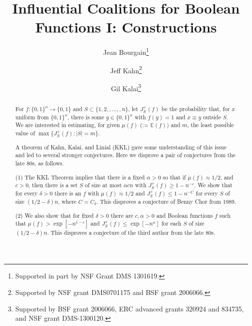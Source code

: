 \documentclass{toc}
\newcommand{\mn}[0]{\medskip\noindent}
\renewcommand{\dots}[0]{,\ldots,}
\newcommand{\0}[0]{\emptyset}
\newcommand{\ga}[0]{\alpha }
\newcommand{\gd}[0]{\delta }
\begin{document}
\renewcommand{\thefootnote}{\fnsymbol{footnote}} %
%
%

\begin{frontmatter} %
  
%
\title{Influential Coalitions for Boolean Functions I: Constructions}  %

%
%

%
%
%

%
%
%
%
%
%
%
%
%
%
%
%


%
%
%
%

%
%

\author[Bourgain]{Jean Bourgain\thanks{Supported in part by NSF Grant DMS 1301619.}}
\author[Kahn]{Jeff Kahn\thanks{Supported by NSF grant DMS0701175  and BSF grant 2006066.}}
\author[Kalai]{Gil Kalai\thanks{Supported by BSF grant 2006066, ERC advanced grants 320924 and 834735, and NSF grant DMS-1300120.}}


%
%
%
%

%
%
%
%
%
%
\begin{abstract}
 For 
$f:\{0,1\}^n \to \{0,1\}$ and
$S\subset \{1,2,\dots,n\}$, let $J^+_S(f)$ be the probability that, 
for $x$ uniform from $ \{0,1\}^n$,
there is some $y\in \{0,1\}^n$ with $f(y)=1$ and $x\equiv y$
%
outside $S$.  %
We are interested in estimating, for given 
%
$\mu (f)$ (:= $\mathbb E(f))$ and $m$, %
the least possible value of $\max\{J^+_S(f): |S|=m\}$.

A theorem of Kahn, Kalai, and Linial (KKL) gave some understanding
of this issue and led to several stronger conjectures.
Here we disprove a pair of conjectures from the late 80s, as follows.

\mn
(1)  
The KKL Theorem implies that there is a fixed $\alpha>0$ so 
that if $\mu (f)\approx 1/2$,
and $c>0$, then there is a set $S$ of size at most $\alpha cn$ 
with $J^+_S(f) \ge 1-n^{-c}$.
We show that for every $\delta >0$ there is an $f$ 
with $\mu (f)\approx 1/2$ and
$J^+_S(f) \le 1-n^{-C}$
for every $S$ of size
%
$(1/2-\delta) n$, where $C=C_\delta$.
This disproves a conjecture of Benny Chor from 1989.

\mn
(2)
We also show that for fixed $\gd>0$
there are $c,\ga >0$ and
Boolean functions $f$ such that $\mu (f) > \exp[-n^{1-c}]$
and $J^+_S(f) \le \exp[-n^\ga]$ for each $S$ of size
%
$(1/2-\gd)n$.
This disproves a conjecture of the third author from the late 80s. 
\end{abstract}

%

\end{frontmatter}
\end{document}
